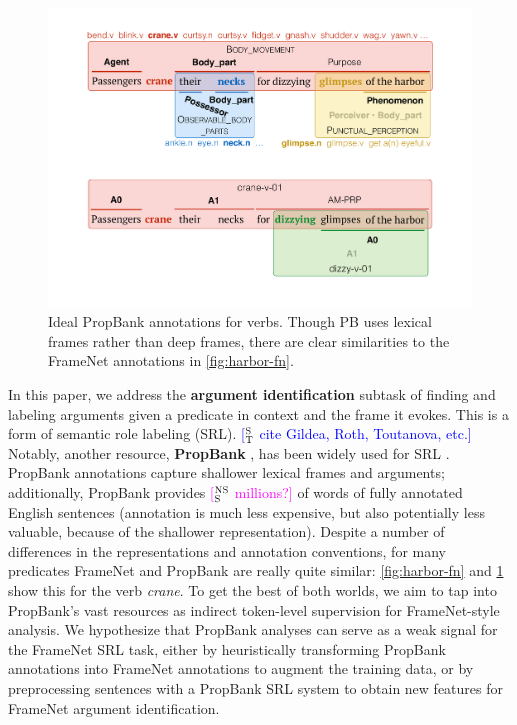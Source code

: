 \documentclass[11pt,a4paper]{article}
\newcommand{\ensuretext}[1]{#1}
\newcommand{\nssmarker}{\ensuretext{\textcolor{magenta}{\ensuremath{^{\textsc{NS}}_{\textsc{S}}}}}}
\newcommand{\stmarker}{\ensuretext{\textcolor{blue}{\ensuremath{^{\textsc{S}}_{\textsc{T}}}}}}
\newcommand{\arkcomment}[3]{\ensuretext{\textcolor{#3}{[#1 #2]}}}
\newcommand{\nss}[1]{\arkcomment{\nssmarker}{#1}{magenta}}
\newcommand{\st}[1]{\arkcomment{\stmarker}{#1}{blue}}
\begin{document}
\begin{figure}
\includegraphics[width=\columnwidth]{harbor-pb.pdf}
\caption{Ideal PropBank annotations for verbs. Though PB uses lexical frames rather than deep frames,
there are clear similarities to the FrameNet annotations in \cref{fig:harbor-fn}.}
\label{fig:harbor-pb}
\end{figure}

In this paper, we address the \textbf{argument identification} 
subtask of finding and labeling arguments 
given a predicate in context and the frame it evokes.
This is a form of semantic role labeling (SRL).
\st{cite Gildea, Roth, Toutanova, etc.}
Notably, another resource, \textbf{PropBank} \citep{propbank}, has been widely used for SRL \citep{palmer-10}. 
PropBank annotations capture shallower lexical frames and arguments; 
additionally, PropBank provides \nss{millions?} of words of fully annotated English sentences
(annotation is much less expensive, but also potentially less valuable, because of the shallower representation).
Despite a number of differences in the representations and annotation conventions, 
for many predicates FrameNet and PropBank are really quite similar: 
\cref{fig:harbor-fn} and \cref{fig:harbor-pb} show this for the verb \textit{crane}.
To get the best of both worlds, we aim to tap into PropBank's vast resources 
as indirect token-level supervision for FrameNet-style analysis. 
We hypothesize that PropBank analyses can serve as a weak signal for the FrameNet SRL task, 
either by heuristically transforming PropBank annotations into FrameNet annotations 
to augment the training data, or by preprocessing sentences with a PropBank SRL system to obtain new features 
for FrameNet argument identification.
\end{document}
